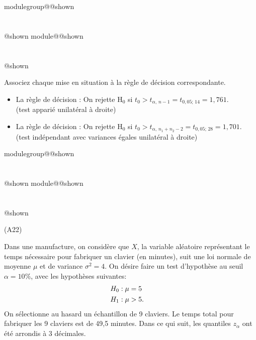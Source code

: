 \documentclass{Evaluation}
\makeatletter
\newcommand{\currentmodulekey}{}
\newcommand{\currentmoduletitle}{}
\newcommand{\currentgroupkey}{}
\newcommand{\currentgrouptitle}{}
\newcommand{\showmoduleifneeded}{%
  \ifx\currentgroupkey\empty\else
    \expandafter\ifx\csname modulegroup@\currentgroupkey @shown\endcsname\relax
      \section*{\currentgrouptitle}%
      \expandafter\gdef\csname modulegroup@\currentgroupkey @shown\endcsname{1}%
    \fi
  \fi
  \expandafter\ifx\csname module@\currentmodulekey @shown\endcsname\relax
    \section*{\currentmoduletitle}%
    \expandafter\gdef\csname module@\currentmodulekey @shown\endcsname{1}%
  \fi
}
\newenvironment{A22}{\showmoduleifneeded}{}
\makeatother
\begin{document}
\begin{questions}
\begin{A22}
\medskip

Associez chaque mise en situation à la règle de décision correspondante.

\medskip


 
\begin{solution}
	\begin{itemize}
		\item La règle de décision : On rejette $\mathrm{H}_0$ si $t_0 > t_{\alpha, \, n-1} = t_{0,05; \, 14} = 1,761$.\\
		(test apparié unilatéral à droite)
		\item La règle de décision : On rejette $\mathrm{H}_0$ si $t_0 > t_{\alpha, \, n_1+n_2-2} = t_{0,05; \, 28} = 1,701$.\\
		(test indépendant avec variances égales unilatéral à droite)
	\end{itemize}
\end{solution}

\end{A22}

\begin{A22}
\question
(A22)

Dans une manufacture, on considère que $X$, la variable aléatoire représentant le temps nécessaire pour fabriquer un clavier (en minutes), suit une loi normale de moyenne $\mu$ et de variance $\sigma^2=4$. On désire faire un test d'hypothèse au seuil $\alpha=10\%$, avec les hypothèses suivantes:
\begin{align*}
	H_0&: \mu=5\cr
	H_1&: \mu > 5.
\end{align*}
On sélectionne au hasard un échantillon de 9 claviers. Le temps total pour fabriquer les 9 claviers est de 49,5 minutes. Dans ce qui suit, les quantiles $z_\alpha$ ont été arrondis à 3 décimales.



\end{A22}
\end{questions}
\end{document}
